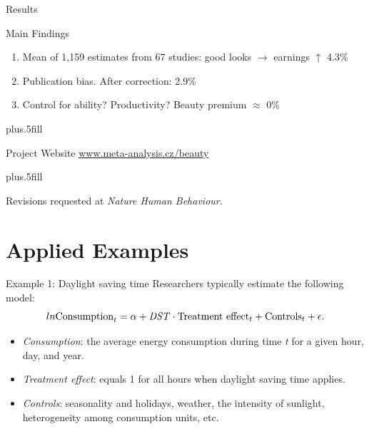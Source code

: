 \documentclass{beamer} %
\begin{document}
\begin{frame}{Results}
  \begin{block}{Main Findings}
  \begin{enumerate}
  \item
Mean of 1,159 estimates from 67 studies: good looks $\rightarrow$ earnings $\uparrow$ 4.3\%
\item
Publication bias. After correction: 2.9\%
    \item
Control for ability? Productivity? Beauty premium $\approx$ 0\%
  \end{enumerate}
  \end{block}

\vskip0pt plus.5fill
    \begin{block}{Project Website}
      \href{http://www.meta-analysis.cz/beauty}{www.meta-analysis.cz/beauty}
    \end{block}
		
		\vskip0pt plus.5fill
		
		Revisions requested at \emph{Nature Human Behaviour}.
		
\end{frame}





\section{Applied Examples}


\begin{frame}{Example 1: Daylight saving time}
Researchers typically estimate the following model: 
\begin{equation*}\label{eq:dst}
ln\text{Consumption}_{t} = \alpha + \text{\emph{DST}}\cdot\text{Treatment effect}_{t} + \text{Controls}_{t} + \epsilon.
\end{equation*}
\vspace{-0.5cm}
\begin{itemize}
	\item \emph{Consumption}: the average energy consumption during time \emph{t} for a given hour, day, and year.
\item \emph{Treatment effect}: equals 1 for all hours when daylight saving time applies. 
\item \emph{Controls}: seasonality and holidays, weather, the intensity of sunlight, heterogeneity among consumption units, etc. 
\end{itemize}
\end{frame}
\end{document}
